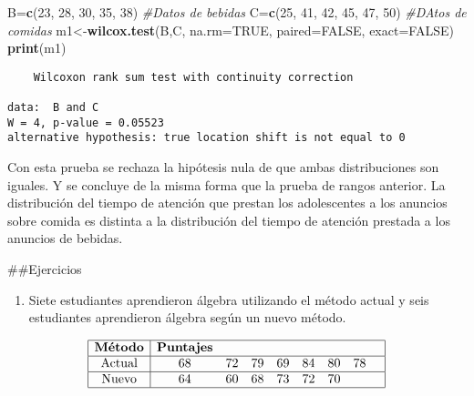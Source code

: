 \documentclass[
  a4paper,
  oneside,
  openany]{book}
\newenvironment{Shaded}{\begin{snugshade}}{\end{snugshade}}
\newcommand{\CommentTok}[1]{\textcolor[rgb]{0.56,0.35,0.01}{\textit{#1}}}
\newcommand{\DataTypeTok}[1]{\textcolor[rgb]{0.13,0.29,0.53}{#1}}
\newcommand{\DecValTok}[1]{\textcolor[rgb]{0.00,0.00,0.81}{#1}}
\newcommand{\KeywordTok}[1]{\textcolor[rgb]{0.13,0.29,0.53}{\textbf{#1}}}
\newcommand{\NormalTok}[1]{#1}
\newcommand{\OtherTok}[1]{\textcolor[rgb]{0.56,0.35,0.01}{#1}}
\providecommand{\tightlist}{%
  \setlength{\itemsep}{0pt}\setlength{\parskip}{0pt}}
\begin{document}
\begin{Shaded}
\begin{Highlighting}[]
\NormalTok{B=}\KeywordTok{c}\NormalTok{(}\DecValTok{23}\NormalTok{, }\DecValTok{28}\NormalTok{, }\DecValTok{30}\NormalTok{, }\DecValTok{35}\NormalTok{, }\DecValTok{38}\NormalTok{)     }\CommentTok{\#Datos de bebidas}
\NormalTok{C=}\KeywordTok{c}\NormalTok{(}\DecValTok{25}\NormalTok{, }\DecValTok{41}\NormalTok{, }\DecValTok{42}\NormalTok{, }\DecValTok{45}\NormalTok{, }\DecValTok{47}\NormalTok{, }\DecValTok{50}\NormalTok{) }\CommentTok{\#DAtos de comidas}
\NormalTok{m1\textless{}{-}}\KeywordTok{wilcox.test}\NormalTok{(B,C, }\DataTypeTok{na.rm=}\OtherTok{TRUE}\NormalTok{, }\DataTypeTok{paired=}\OtherTok{FALSE}\NormalTok{, }\DataTypeTok{exact=}\OtherTok{FALSE}\NormalTok{)}
\KeywordTok{print}\NormalTok{(m1)}
\end{Highlighting}
\end{Shaded}

\begin{verbatim}
    Wilcoxon rank sum test with continuity correction

data:  B and C
W = 4, p-value = 0.05523
alternative hypothesis: true location shift is not equal to 0
\end{verbatim}

Con esta prueba se rechaza la hipótesis nula de que ambas distribuciones son iguales. Y se concluye de la misma forma que la prueba de rangos anterior. La distribución del tiempo de atención que prestan los adolescentes a los anuncios sobre comida es distinta a la distribución del tiempo de atención prestada a los anuncios de bebidas.

\#\#Ejercicios

\begin{enumerate}
\def\labelenumi{\arabic{enumi}.}
\tightlist
\item
  Siete estudiantes aprendieron álgebra utilizando el método actual y seis estudiantes aprendieron álgebra según un nuevo método.
\end{enumerate}

\[
\begin{array}{|c| c c c c c c c c|} 
\hline 
\textbf{Método} &\textbf{Puntajes} &&&&& & & \\ 
 \hline
\mbox{Actual} & 68 & 72 & 79 & 69 & 84 & 80 & 78 &\\ 
 \hline
\mbox{Nuevo} & 64 & 60 & 68 & 73 & 72 & 70& & \\ 
\hline
\end{array}
\]
\end{document}
